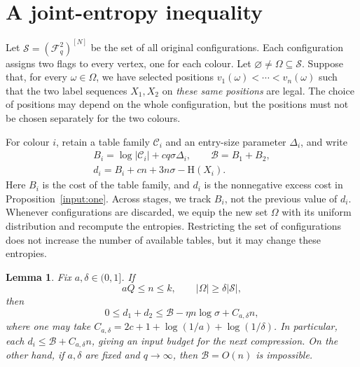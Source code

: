 \documentclass[11pt]{article}
\newtheorem{lemma}[theorem]{Lemma}
\theoremstyle{definition}
\theoremstyle{remark}
\newcommand{\F}{\mathcal F_q}
\newcommand{\HH}{\mathrm H}
\newcommand{\CC}{\mathcal C}
\newcommand{\BB}{\mathcal B}
\newcommand{\SSS}{\mathscr S}
\begin{document}
\section{A joint-entropy inequality}\label{sec:balance}

Let $\SSS=(\F^2)^{[N]}$ be the set of all original configurations.
Each configuration assigns two flags to every vertex, one for each
colour. Let $\varnothing\ne\Omega\subseteq\SSS$. Suppose that, for every
$\omega\in\Omega$, we have selected positions
$v_1(\omega)<\cdots<v_n(\omega)$ such that the two label sequences
$X_1,X_2$ on \emph{these same positions} are legal. The choice of
positions may depend on the whole configuration, but the positions
must not be chosen separately for the two colours.

For colour $i$, retain a table family $\CC_i$ and an entry-size
parameter $\Delta_i$, and write
\begin{equation}\label{eq:table-budget}
 \begin{gathered}
 B_i=\log|\CC_i|+cq\sigma\Delta_i,\qquad
 \BB=B_1+B_2,\\
 d_i=B_i+cn+3n\sigma-\HH(X_i).
 \end{gathered}
\end{equation}
Here $B_i$ is the cost of the table family, and $d_i$ is the nonnegative
excess cost in Proposition~\ref{input:one}. Across stages, we track
$B_i$, not the previous value of $d_i$. Whenever configurations are
discarded, we equip the new set $\Omega$ with its uniform distribution
and recompute the entropies. Restricting the set of configurations does
not increase the number of available tables, but it may change these
entropies.

\begin{lemma}\label{lem:balance}
Fix $a,\delta\in(0,1]$. If
\[
 aQ\le n\le k,\qquad |\Omega|\ge\delta|\SSS|,
\]
then
\begin{equation}\label{eq:balance}
 0\le d_1+d_2
 \le\BB-\eta n\log\sigma+C_{a,\delta}n,
\end{equation}
where one may take
$C_{a,\delta}=2c+1+\log(1/a)+\log(1/\delta)$.
In particular, each $d_i\le\BB+C_{a,\delta}n$, giving an input budget
for the next compression. On the other hand, if $a,\delta$ are fixed
and $q\to\infty$, then $\BB=O(n)$ is impossible.
\end{lemma}
\end{document}
